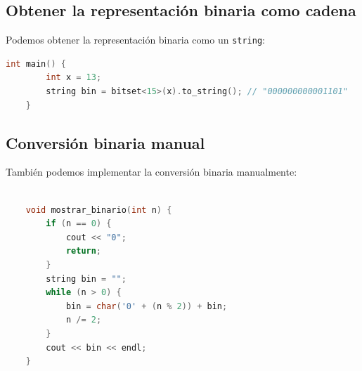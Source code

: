 \subsection{Obtener la representación binaria como cadena}

Podemos obtener la representación binaria como un \texttt{string}:

\begin{lstlisting}[language=C++, caption=Convertir un número a cadena binaria]
	int main() {
		int x = 13;
		string bin = bitset<15>(x).to_string(); // "000000000001101"
	}
\end{lstlisting}

\subsection{Conversión binaria manual}

También podemos implementar la conversión binaria manualmente:

\begin{lstlisting}[language=C++, caption=Conversión manual de decimal a binario]
	
	void mostrar_binario(int n) {
		if (n == 0) {
			cout << "0";
			return;
		}
		string bin = "";
		while (n > 0) {
			bin = char('0' + (n % 2)) + bin;
			n /= 2;
		}
		cout << bin << endl;
	}
\end{lstlisting}



 